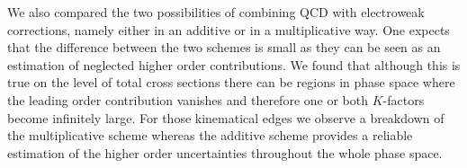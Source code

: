 We also compared the two possibilities of combining QCD with electroweak corrections, namely either in an additive or
in a multiplicative way. One expects that the difference between the two schemes is small as they can be seen as an estimation
of neglected higher order contributions. We found that although this is true on the level of total cross sections there can be 
regions in phase space where the leading order contribution vanishes and therefore one or both $K$-factors become infinitely large. 
For those kinematical edges we observe a breakdown of the multiplicative scheme whereas the additive scheme provides
a reliable estimation of the higher order uncertainties throughout the whole phase space.



